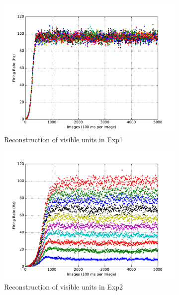 \begin{figure}
\begin{subfigure}[t]{0.4\textwidth}
		\includegraphics[width=\textwidth]{pics_sdlm/13_exp_SRBM_noise_long/exp1_recon_s.pdf}
		\caption{Reconstruction of visible units in Exp1}
	\end{subfigure}
	\begin{subfigure}[t]{0.4\textwidth}
		\includegraphics[width=\textwidth]{pics_sdlm/13_exp_SRBM_noise_long/exp2_recon_s.pdf}
		\caption{Reconstruction of visible units in Exp2}
	\end{subfigure}\\
	\begin{subfigure}[t]{0.4\textwidth}

\end{subfigure}
\end{figure}
